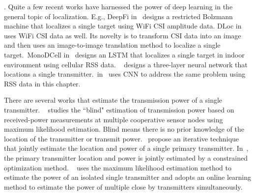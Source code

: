 . 
Quite a few recent works have harnessed the power of deep learning in the general topic of localization.
E.g., DeepFi in~\cite{DeepFi2016} designs a restricted Bolzmann machine that localizes a single target using WiFi CSI amplitude data. 
DLoc in~\cite{mobicom20-deeploc} uses WiFi CSI data as well. 
Its novelty is to transform CSI data into an image and then uses an image-to-image translation method to localize a single target.~MonoDCell 
in~\cite{sigspatial19-monodcell} designs an LSTM that localizes a single target in indoor environment using cellular RSS data.
~\cite{pimrc2021-localize} designs a three-layer neural network that locations a single transmitter.~\deeptx in~\cite{icccn20-deeptxfinder} 
uses CNN to address the same \mtl problem using RSS data in this chapter.

 There are several works that estimate the transmission power of a single transmitter.
~\cite{PowerEstimate2010Zafer} studies the ``blind" estimation of transmission power based on received-power measurements at 
multiple cooperative sensor nodes using maximum likelihood estimation. Blind means there is no prior knowledge of the location of the 
transmitter or transmit power.~\cite{Ureten2011powerlocation} propose an iterative technique that jointly estimate the location and 
power of a single primary transmitter.
In~\cite{icoin2007-powerposition}, the primary transmitter location and power is jointly estimated by a constrained optimization method.
~\cite{ipsn20-mtl} uses the maximum likelihood estimation method to estimate the power of an isolated single transmitter and 
adopts an online learning method to estimate the power of multiple close by transmitters simultaneously.

